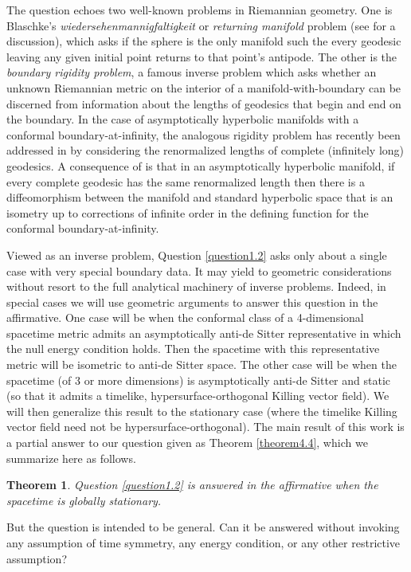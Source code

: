 \documentclass[12pt]{amsart}
\numberwithin{equation}{section}
\newtheorem{theorem}{Theorem}[section]
\begin{document}

The question echoes two well-known problems in Riemannian geometry. One is Blaschke's \emph{wiedersehenmannigfaltigkeit} or \emph{returning manifold} problem (see \cite[p 493]{Berger} for a discussion), which asks if the sphere is the only manifold such the every geodesic leaving any given initial point returns to that point's antipode. The other is the \emph{boundary rigidity problem}, a famous inverse problem which asks whether an unknown Riemannian metric on the interior of a manifold-with-boundary can be discerned from information about the lengths of geodesics that begin and end on the boundary. In the case of asymptotically hyperbolic manifolds with a conformal boundary-at-infinity, the analogous rigidity problem has recently been addressed in \cite{GGSU} by considering the renormalized lengths of complete (infinitely long) geodesics. A consequence of \cite[Theorem 2]{GGSU} is that in an asymptotically hyperbolic manifold, if every complete geodesic has the same renormalized length then there is a diffeomorphism between the manifold and standard hyperbolic space that is an isometry up to corrections of infinite order in the defining function for the conformal boundary-at-infinity.

Viewed as an inverse problem, Question \ref{question1.2} asks only about a single case with very special boundary data. It may yield to geometric considerations without resort to the full analytical machinery of inverse problems. Indeed, in special cases we will use geometric arguments to answer this question in the affirmative. One case will be when the conformal class of a 4-dimensional spacetime metric admits an asymptotically anti-de Sitter representative in which the null energy condition holds. Then the spacetime with this representative metric will be isometric to anti-de Sitter space. The other case will be when the spacetime (of 3 or more dimensions) is asymptotically anti-de Sitter and static (so that it admits a timelike, hypersurface-orthogonal Killing vector field). We will then generalize this result to the stationary case (where the timelike Killing vector field need not be hypersurface-orthogonal). The main result of this work is a partial answer to our question given as Theorem \ref{theorem4.4}, which we summarize here as follows.
\begin{theorem}
\noindent \emph{Question \ref{question1.2} is answered in the affirmative when the spacetime is globally stationary.}
\end{theorem}
But the question is intended to be general. Can it be answered without invoking any assumption of time symmetry, any energy condition, or any other restrictive assumption?
\end{document}
